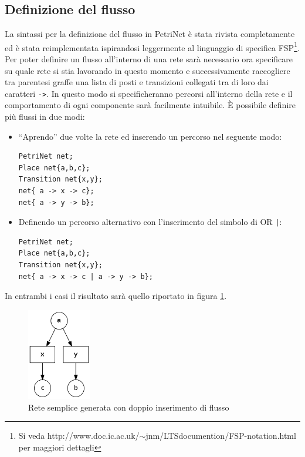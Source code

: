 \documentclass[italian,12pt]{book}
\begin{document}
\subsection{Definizione del flusso}\label{ssect:nuovi_archi}
La sintassi per la definizione del flusso in PetriNet è stata rivista completamente ed è stata 
reimplementata ispirandosi leggermente al linguaggio di specifica FSP\footnote{ Si veda 
http://www.doc.ic.ac.uk/$\sim$jnm/LTSdocumention/FSP-notation.html per maggiori dettagli}.\\
Per poter definire un flusso all'interno di una rete sarà necessario ora specificare su quale rete si stia 
lavorando in questo momento e successivamente raccogliere tra parentesi graffe una lista di posti e transizioni
collegati tra di loro dai caratteri {\tt ->}. In questo modo si specificheranno percorsi all'interno della 
rete e il comportamento di ogni componente sarà facilmente intuibile.
È possibile definire più flussi in due modi:
\begin{itemize}

\item ``Aprendo'' due volte la rete ed inserendo un percorso nel seguente modo:
\begin{verbatim}PetriNet net;
Place net{a,b,c};
Transition net{x,y};
net{ a -> x -> c};
net{ a -> y -> b};
\end{verbatim}

\item Definendo un percorso alternativo con l'inserimento del simbolo di OR {\tt |}:
\begin{verbatim}PetriNet net;
Place net{a,b,c};
Transition net{x,y};
net{ a -> x -> c | a -> y -> b};
\end{verbatim}
\end{itemize}

In entrambi i casi il risultato sarà quello riportato in figura \ref{fig:flussi1.png}.
\begin{figure}[htb]
\centerline{\includegraphics[height=4cm]{img/flussi1.png}}
\caption{Rete semplice generata con doppio inserimento di flusso}\label{fig:flussi1.png}
\end{figure}
\end{document}
